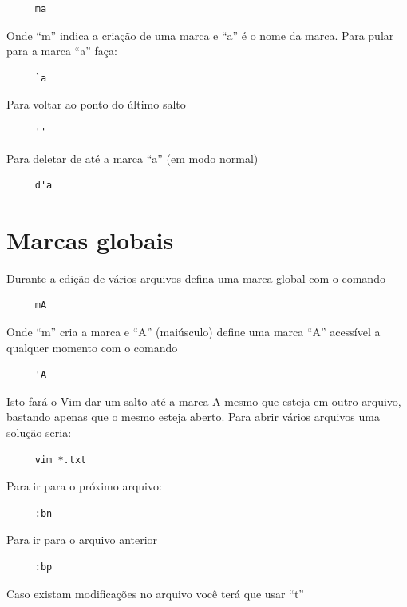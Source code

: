 \documentclass[10pt,a4paper,openany]{book}
\begin{document}
\begin{verbatim}
     ma
\end{verbatim}

Onde ``m'' indica a criação de uma marca e ``a'' é o nome da marca. Para pular para a marca ``a'' faça:

\begin{verbatim}
     `a
\end{verbatim}

Para voltar ao ponto do último salto

\begin{verbatim}
     ''
\end{verbatim}

Para deletar de até a marca ``a'' (em modo normal)

\begin{verbatim}
     d'a
\end{verbatim}

\section{Marcas globais}
Durante a edição de vários arquivos defina uma marca global com o comando

\begin{verbatim}
     mA
\end{verbatim}

Onde ``m'' cria a marca e ``A'' (maiúsculo) define uma marca ``A'' acessível a qualquer momento com o comando

\begin{verbatim}
     'A
\end{verbatim}

Isto fará o Vim dar um salto até a marca A mesmo que esteja em outro
arquivo, bastando apenas que o mesmo esteja aberto. Para abrir vários
arquivos uma solução seria:

\begin{verbatim}
     vim *.txt
\end{verbatim}

Para ir para o próximo arquivo:

\begin{verbatim}
     :bn
\end{verbatim}

Para ir para o arquivo anterior

\begin{verbatim}
     :bp
\end{verbatim}

Caso existam modificações no arquivo você terá que usar ``t''
\end{document}
